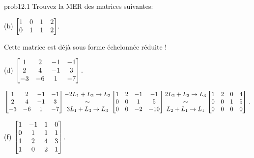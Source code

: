 



\begin{sol}{prob12.1} Trouvez la MER des matrices suivantes:
\medskip

(b) 
$\bmatrix 1&0&1&2\cr 0&1&1&2\endbmatrix $.

\soln Cette matrice est déjà sous forme échelonnée réduite !
\medskip

(d) $\bmatrix 1&2&-1&-1\\2&4&-1&3\\ -3&-6&1&-7\endbmatrix$.

\soln
$$\bmatrix 1&2&-1&-1\\2&4&-1&3\\ -3&-6&1&-7\endbmatrix\begin{matrix} -2L_1+L_2\to L_2 \\ \sim \\3L_1+L_3\to L_3 \end{matrix}\bmatrix 
1&2&-1&-1\\
0&0&1&5\\ 
0&0&-2&-10\endbmatrix\begin{matrix} 2L_2+L_3\to L_3 \\ \sim \\L_2+L_1\to L_1 \end{matrix}\bmatrix
1 & 2 & 0 & 4 \\
 0 & 0 & 1 & 5 \\
 0 & 0 & 0 & 0 \endbmatrix\,.$$

\medskip
 

(f) $\bmatrix 
1 & -1 & 1 & 0 \\
 0 & 1 & 1 & 1 \\
 1 & 2 & 4 & 3 \\
 1 & 0 & 2 & 1\endbmatrix$.


\end{sol}
